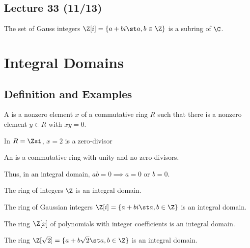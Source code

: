 \subsection*{Lecture 33 (11/13)} %

\begin{example}
  The set of Gauss integers \(\Z[i] = \{a+bi\st a,b\in\Z\}\) is a subring of \(\C\).
\end{example}

\section{Integral Domains}
\subsection{Definition and Examples}
\begin{definition}
  A  is a nonzero element \(x\) of a commutative ring \(R\) such that there is
  a nonzero element \(y\in R\) with \(xy=0\).
\end{definition}

\begin{example}
  In \(R = \Zsi\), \(x=2\) is a zero-divisor
\end{example}

\begin{definition}
  An  is a commutative ring with unity and no zero-divisors.
\end{definition}

Thus, in an integral domain, \(ab=0\implies a=0\) or \(b=0\).

\begin{example}
  The ring of integers \(\Z\) is an integral domain.
\end{example}

\begin{example}
  The ring of Gaussian integers \(\Z[i] = \{a+bi \st a,b\in\Z\}\) is an integral domain.
\end{example}

\begin{example}
  The ring \(\Z[x]\) of polynomials with integer coefficients is an integral domain.
\end{example}

\begin{example}
  The ring \(\Z[\sqrt{2}]=\{a+b\sqrt{2}\st a,b\in\Z\}\) is an integral domain.
\end{example}

